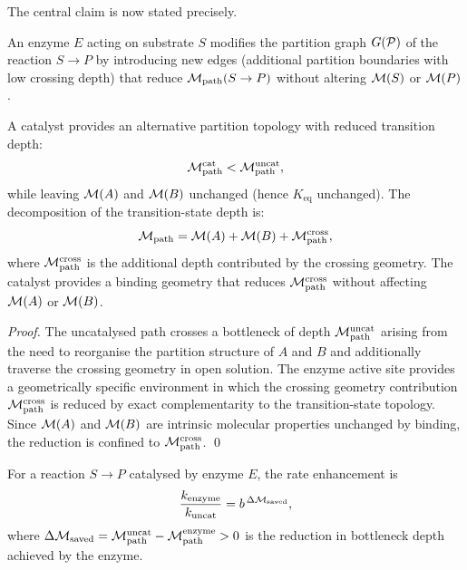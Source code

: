 The central claim is now stated precisely.

\begin{definition}
\label{def:enzymatic_topology}
An enzyme $E$ acting on substrate $S$ modifies the partition graph
$G(\mathcal{P})$ of the reaction $S \to P$ by introducing new edges (additional
partition boundaries with low crossing depth) that reduce
$\mathcal{M}_{\mathrm{path}}(S \to P)$ without altering $\mathcal{M}(S)$ or
$\mathcal{M}(P)$.
\end{definition}

\begin{theorem}
\label{thm:catalytic_topology}
A catalyst provides an alternative partition topology with reduced transition
depth:
\begin{equation}
  \mathcal{M}_{\mathrm{path}}^{\mathrm{cat}} < \mathcal{M}_{\mathrm{path}}^{\mathrm{uncat}},
\end{equation}
while leaving $\mathcal{M}(A)$ and $\mathcal{M}(B)$ unchanged (hence $K_{\mathrm{eq}}$
unchanged). The decomposition of the transition-state depth is:
\begin{equation}
  \mathcal{M}_{\mathrm{path}} = \mathcal{M}(A) + \mathcal{M}(B) + \mathcal{M}_{\mathrm{path}}^{\mathrm{cross}},
  \label{eq:path_decomposition}
\end{equation}
where $\mathcal{M}_{\mathrm{path}}^{\mathrm{cross}}$ is the additional depth
contributed by the crossing geometry. The catalyst provides a binding geometry
that reduces $\mathcal{M}_{\mathrm{path}}^{\mathrm{cross}}$ without affecting
$\mathcal{M}(A)$ or $\mathcal{M}(B)$.
\end{theorem}

\begin{proof}
The uncatalysed path crosses a bottleneck of depth $\mathcal{M}_{\mathrm{path}}^{\mathrm{uncat}}$
arising from the need to reorganise the partition structure of $A$ and $B$
and additionally traverse the crossing geometry in open solution. The enzyme
active site provides a geometrically specific environment in which the crossing
geometry contribution $\mathcal{M}_{\mathrm{path}}^{\mathrm{cross}}$ is reduced
by exact complementarity to the transition-state topology. Since $\mathcal{M}(A)$
and $\mathcal{M}(B)$ are intrinsic molecular properties unchanged by binding,
the reduction is confined to $\mathcal{M}_{\mathrm{path}}^{\mathrm{cross}}$. \qed
\end{proof}

\begin{theorem}
\label{thm:enzyme_rate}
For a reaction $S \to P$ catalysed by enzyme $E$, the rate enhancement is
\begin{equation}
  \frac{k_{\mathrm{enzyme}}}{k_{\mathrm{uncat}}}
    = b^{\,\Delta\mathcal{M}_{\mathrm{saved}}},
  \label{eq:rate_enhancement}
\end{equation}
where $\Delta\mathcal{M}_{\mathrm{saved}}
  = \mathcal{M}_{\mathrm{path}}^{\mathrm{uncat}} - \mathcal{M}_{\mathrm{path}}^{\mathrm{enzyme}} > 0$
is the reduction in bottleneck depth achieved by the enzyme.
\end{theorem}

